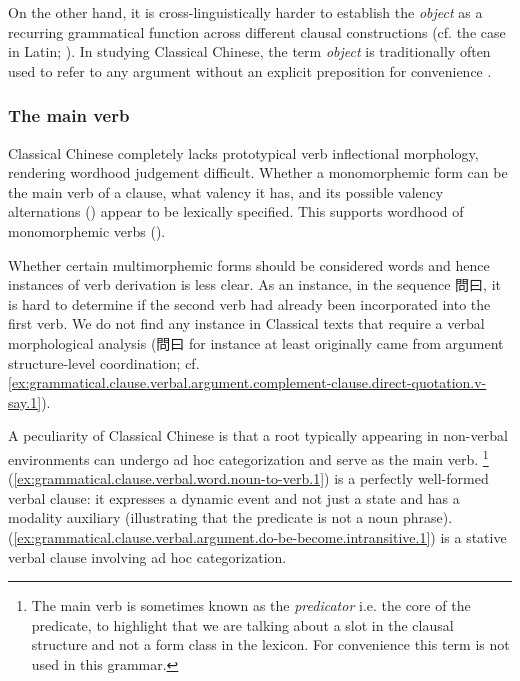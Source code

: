 \documentclass[UTF8, a4paper, oneside, scheme=plain, 12pt]{ctexrep}
\newcommand*{\citepage}[1]{p.~{#1}}
\newcommand*{\citepages}[1]{pp.~{#1}}
\newcommand*{\term}[1]{\emph{#1}}
\begin{document}
On the other hand, it is cross-linguistically harder to establish the \term{object} as a recurring grammatical function across different clausal constructions (cf. the case in Latin; \citealt[\citepages{28-29}]{Pinkster1}).
In studying Classical Chinese, the term \term{object} is traditionally often used to refer to any argument without an explicit preposition for convenience \citep[\citepage{102}]{li2004grammar}. 



\subsubsection{The main verb}
\label{sec:grammatical.clause.verbal.word}

Classical Chinese completely lacks prototypical verb inflectional morphology,
rendering wordhood judgement difficult.
Whether a monomorphemic form can be the main verb of a clause,
what valency it has, and its possible valency alternations () appear to be lexically specified.
This supports wordhood of monomorphemic verbs ().

Whether certain multimorphemic forms should be considered words and hence instances of verb derivation is less clear.
As an instance, in the sequence 問曰, it is hard to determine if the second verb had already been incorporated into the first verb. 
We do not find any instance in Classical texts that require a verbal morphological analysis 
(問曰 for instance at least originally came from argument structure-level coordination; cf. \ref{ex:grammatical.clause.verbal.argument.complement-clause.direct-quotation.v-say.1}).

A peculiarity of Classical Chinese is that a root typically appearing in non-verbal environments can undergo ad hoc categorization and serve as the main verb.%
\footnote{
    The main verb is sometimes known as the \term{predicator} i.e. the core of the predicate,
    to highlight that we are talking about a slot in the clausal structure and not a form class in the lexicon.
    For convenience this term is not used in this grammar.
}
(\ref{ex:grammatical.clause.verbal.word.noun-to-verb.1}) is a perfectly well-formed verbal clause:
it expresses a dynamic event and not just a state and has a modality auxiliary (illustrating that the predicate is not a noun phrase).
(\ref{ex:grammatical.clause.verbal.argument.do-be-become.intransitive.1}) is a stative verbal clause involving ad hoc categorization.
\end{document}
